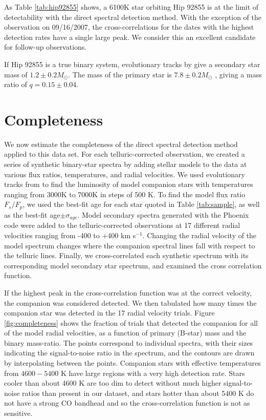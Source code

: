 \documentclass[11pt]{report}     %
\begin{document}
As Table \ref{tab:hip92855} shows, a 6100K star orbiting Hip 92855 is at
the limit of detectability with the direct spectral detection
method. With the exception of the observation on 09/16/2007, the
cross-correlations for the dates with the highest detection rates have
a single large peak. We consider this an excellent candidate for
follow-up observations.

If Hip 92855 is a true binary system, evolutionary tracks by
\cite{Landin2008} give a secondary star mass of $1.2 \pm 0.2 M_{\odot}$. The mass of the
primary star is $7.8 \pm 0.2 M_{\odot}$ \citep{Tetzlaff2010}, giving a mass
ratio of $q = 0.15 \pm 0.04$. 




\section{Completeness}
\label{sec:completeness}
We now estimate the completeness of the direct spectral detection
method applied to this data set. For each telluric-corrected observation, we
created a series of synthetic binary-star spectra by adding stellar models to
the data at various flux ratios, temperatures, and radial
velocities. We used evolutionary tracks from \cite{Landin2008} to
find the luminosity of model companion stars with temperatures ranging from 3000K to
7000K in steps of 500 K. To find the model flux ratio $F_s/F_p$, we
used the best-fit age for each star quoted in
Table \ref{tab:sample}, as well as the best-fit age$\pm
\sigma_{age}$. Model secondary spectra generated with the Phoenix code
\citep{Hauschildt1999} were added to the telluric-corrected
observations at 17 different radial velocities ranging
from -400 to +400 km s$^{-1}$. Changing the radial velocity of the model
spectrum changes where the companion spectral lines fall with respect
to the telluric lines. Finally, we cross-correlated each synthetic
spectrum with its corresponding model secondary star spectrum, and examined the cross
correlation function. 

If the highest peak in the cross-correlation function was at the
correct velocity, the companion was considered detected. We then
tabulated how many times the companion star was detected in the 17
radial velocity trials. Figure \ref{fig:completeness} shows the
fraction of trials that detected the companion for all of the model
radial velocities, as a function of primary (B-star) mass and the binary mass-ratio. The points
correspond to individual spectra, with their sizes indicating the
signal-to-noise ratio in the spectrum, and the contours are drawn by
interpolating between the points. Companion stars with effective
temperatures from $4600-5400$ K have large regions with a very high
detection rate. Stars cooler than about 4600 K are too dim to detect
without much higher signal-to-noise ratios than present in our dataset, and stars hotter than about
5400 K do not have a strong CO bandhead and so the cross-correlation
function is not as sensitive. 
\end{document}
